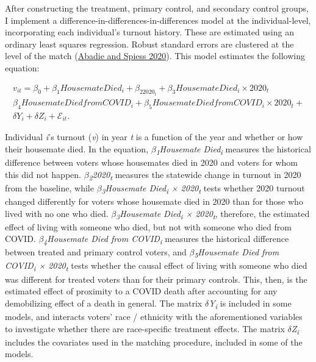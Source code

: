 \documentclass[
  12pt,
]{article}
\begin{document}
After constructing the treatment, primary control, and secondary control groups, I implement a difference-in-differences-in-differences model at the individual-level, incorporating each individual's turnout history. These are estimated using an ordinary least squares regression. Robust standard errors are clustered at the level of the match (\protect\hyperlink{ref-Abadie2020}{Abadie and Spiess 2020}). This model estimates the following equation:

\begin{gather}
\label{eq:1}
v_{it} = \beta_0 + \beta_1Housemate Died_{i}+\beta_22020_{t} + \beta_3Housemate Died_{i}\times 2020_{t} \nonumber \\
\beta_4Housemate Died from COVID_{i} + \beta_5Housemate Died from COVID_{i}\times 2020_{t} + \\
\delta{Y}_{i} + \delta{Z}_{i} + \mathcal{E}_{it}. \nonumber
\end{gather}

Individual \emph{i}'s turnout (\emph{v}) in year \emph{t} is a function of the year and whether or how their housemate died. In the equation, \emph{\(\beta\)\textsubscript{1}Housemate Died\textsubscript{i}} measures the historical difference between voters whose housemates died in 2020 and voters for whom this did not happen. \emph{\(\beta\)\textsubscript{2}2020\textsubscript{t}} measures the statewide change in turnout in 2020 from the baseline, while \emph{\(\beta\)\textsubscript{3}Housemate Died\textsubscript{i} × 2020\textsubscript{t}} tests whether 2020 turnout changed differently for voters whose housemate died in 2020 than for those who lived with no one who died. \emph{\(\beta\)\textsubscript{3}Housemate Died\textsubscript{i} × 2020\textsubscript{t}}, therefore, the estimated effect of living with someone who died, but not with someone who died from COVID. \emph{\(\beta\)\textsubscript{4}Housemate Died from COVID\textsubscript{i}} measures the historical difference between treated and primary control voters, and \emph{\(\beta\)\textsubscript{5}Housemate Died from COVID\textsubscript{i} × 2020\textsubscript{t}} tests whether the causal effect of living with someone who died was different for treated voters than for their primary controls. This, then, is the estimated effect of proximity to a COVID death after accounting for any demobilizing effect of a death in general. The matrix \emph{\(\delta\)Y\textsubscript{i}} is included in some models, and interacts voters' race / ethnicity with the aforementioned variables to investigate whether there are race-specific treatment effects. The matrix \emph{\(\delta\)Z\textsubscript{i}} includes the covariates used in the matching procedure, included in some of the models.
\end{document}
